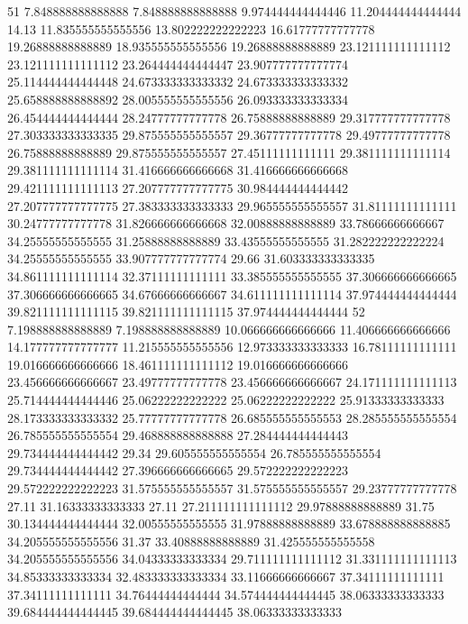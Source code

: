 51 7.848888888888888 7.848888888888888 9.974444444444446 11.204444444444444 14.13 11.835555555555556 13.802222222222223 16.61777777777778 19.26888888888889 18.935555555555556 19.26888888888889 23.121111111111112 23.121111111111112 23.264444444444447 23.907777777777774 25.114444444444448 24.673333333333332 24.673333333333332 25.658888888888892 28.005555555555556 26.093333333333334 26.454444444444444 28.24777777777778 26.75888888888889 29.317777777777778 27.303333333333335 29.875555555555557 29.36777777777778 29.49777777777778 26.75888888888889 29.875555555555557 27.45111111111111 29.381111111111114 29.381111111111114 31.416666666666668 31.416666666666668 29.421111111111113 27.207777777777775 30.984444444444442 27.207777777777775 27.383333333333333 29.965555555555557 31.81111111111111 30.24777777777778 31.826666666666668 32.00888888888889 33.78666666666667 34.25555555555555 31.25888888888889 33.43555555555555 31.282222222222224 34.25555555555555 33.907777777777774 29.66 31.603333333333335 34.861111111111114 32.37111111111111 33.385555555555555 37.306666666666665 37.306666666666665 34.67666666666667 34.611111111111114 37.974444444444444 39.821111111111115 39.821111111111115 37.974444444444444
52 7.198888888888889 7.198888888888889 10.066666666666666 11.406666666666666 14.177777777777777 11.215555555555556 12.973333333333333 16.78111111111111 19.016666666666666 18.461111111111112 19.016666666666666 23.456666666666667 23.49777777777778 23.456666666666667 24.171111111111113 25.714444444444446 25.06222222222222 25.06222222222222 25.91333333333333 28.173333333333332 25.77777777777778 26.685555555555553 28.285555555555554 26.785555555555554 29.468888888888888 27.284444444444443 29.734444444444442 29.34 29.605555555555554 26.785555555555554 29.734444444444442 27.396666666666665 29.572222222222223 29.572222222222223 31.575555555555557 31.575555555555557 29.23777777777778 27.11 31.16333333333333 27.11 27.211111111111112 29.97888888888889 31.75 30.134444444444444 32.00555555555555 31.97888888888889 33.678888888888885 34.205555555555556 31.37 33.40888888888889 31.425555555555558 34.205555555555556 34.04333333333334 29.711111111111112 31.331111111111113 34.85333333333334 32.483333333333334 33.11666666666667 37.34111111111111 37.34111111111111 34.76444444444444 34.574444444444445 38.06333333333333 39.684444444444445 39.684444444444445 38.06333333333333
